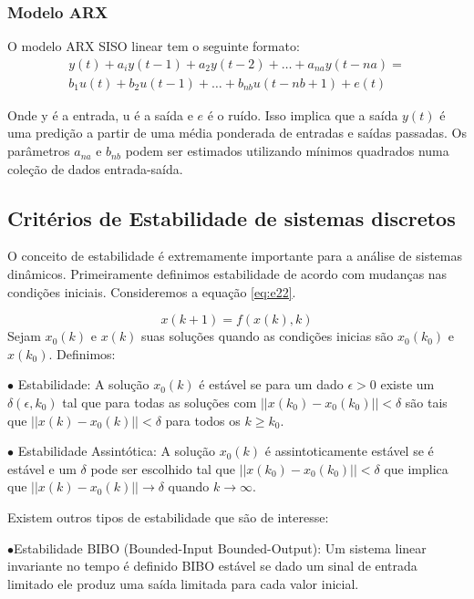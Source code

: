 \subsubsection{Modelo ARX}
O modelo ARX SISO linear tem o seguinte formato:
\begin{equation}\label{eq:ARXModel}
\begin{aligned}
y(t)+a_iy(t-1)+a_2y(t-2)+\dots+a_{na}y(t-na)=\\
b_1u(t)+b_2u(t-1)+\dots+b_{nb}u(t-nb+1)+e(t)
\end{aligned}	
\end{equation}

Onde y é a entrada, u é a saída e $e$ é o ruído. Isso implica que a saída $y(t)$ é uma predição a partir de uma média ponderada de entradas e saídas passadas. Os parâmetros $a_{na}$ e $b_{nb}$ podem ser estimados utilizando mínimos quadrados numa coleção de dados entrada-saída.

\subsection{Critérios de Estabilidade de sistemas discretos}

O conceito de estabilidade é extremamente importante para a análise de sistemas dinâmicos. Primeiramente definimos  estabilidade de acordo com mudanças nas condições iniciais. Consideremos a equação \eqref{eq:e22}.

\begin{equation} \label{eq:e22}
x(k+1)=f(x(k),k)
\end{equation}
Sejam $x_0(k)$ e $x(k)$ suas soluções quando as condições inicias são $x_0(k_0)$ e $x(k_0)$. Definimos:


$\bullet$ Estabilidade: A solução $x_0(k)$ é estável se para um dado $\epsilon>0$ existe um $\delta(\epsilon,k_0)$ tal que para todas as soluções com $||x(k_0)-x_0(k_0)||<\delta$ são tais que $||x(k)-x_0(k)||<\delta$ para todos os $k \geqslant k_0$.


$\bullet$ Estabilidade Assintótica: A solução $x_0(k)$ é assintoticamente estável se é estável e um $\delta$ pode ser escolhido tal que  $||x(k_0)-x_0(k_0)||<\delta$ que implica que $||x(k)-x_0(k)||\to\delta$ quando $k \to \infty$.


Existem outros tipos de estabilidade que são de interesse:


$\bullet$Estabilidade BIBO (Bounded-Input Bounded-Output): Um sistema linear invariante no tempo é definido BIBO estável se dado um sinal de entrada limitado ele produz uma saída limitada para cada valor inicial.


